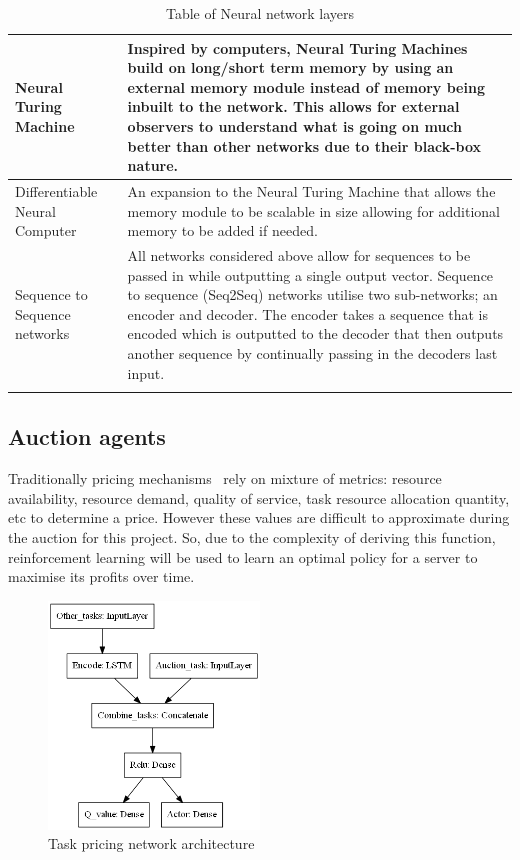 \begin{longtable}{|p{3.5cm}|p{12cm}|}
    Neural Turing Machine~\citep{NTM} & Inspired by computers, Neural Turing Machines build on long/short term memory
        by using an external memory module instead of memory being inbuilt to the network. This allows for external
        observers to understand what is going on much better than other networks due to their black-box nature. \\ \hline

    Differentiable Neural Computer~\citep{DNC} & An expansion to the Neural Turing Machine that allows the memory
        module to be scalable in size allowing for additional memory to be added if needed. \\ \hline

    Sequence to Sequence networks \citep{seq2seq} & All networks considered above allow for sequences to be passed in
        while outputting a single output vector. Sequence to sequence (Seq2Seq) networks utilise two sub-networks; an
        encoder and decoder. The encoder takes a sequence that is encoded which is outputted to the decoder that then
        outputs another sequence by continually passing in the decoders last input. \\ \hline
    \caption{Table of Neural network layers}
    \label{tab:neural_network_layers}
\end{longtable}

\subsection{Auction agents}
\label{subsec:auction-agents}
Traditionally pricing mechanisms~\citep{al2013cloud} rely on mixture of metrics: resource availability, resource demand,
quality of service, task resource allocation quantity, etc to determine a price. However
these values are difficult to approximate during the auction for this project. So, due to the complexity of
deriving this function, reinforcement learning will be used to learn an optimal policy for a server to maximise its
profits over time.

\begin{figure}[H]
    \centering
    \includegraphics[width=0.5\textwidth]{figures/3_solution_figs/task_pricing_network_architecture.png}
    \caption{Task pricing network architecture}
    \label{fig:task_pricing_network_architecture}
\end{figure}

